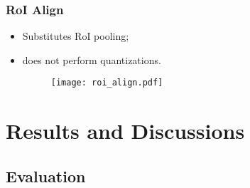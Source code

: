 \documentclass{beamer}
\begin{document}


			\begin{frame}\frametitle{RoI Align}
				\begin{itemize}
					\item Substitutes RoI pooling;
					\item does not perform quantizations.
					\begin{figure}
						\texttt{[image: roi\_align.pdf]}
					\end{figure}
				\end{itemize}
			\end{frame}


	\section{Results and Discussions}

		\subsection{Evaluation}
\end{document}
